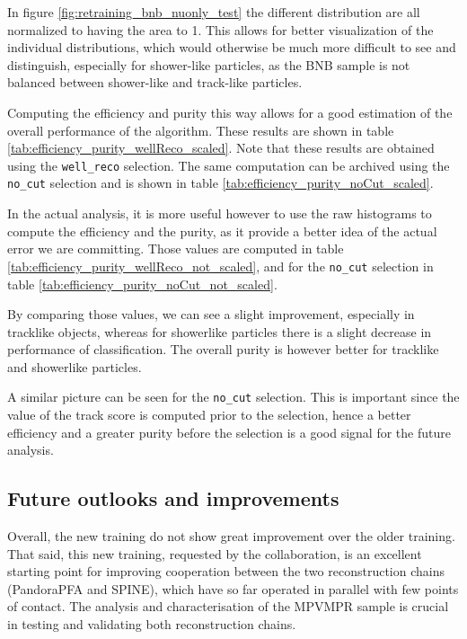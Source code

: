 In figure \ref{fig:retraining_bnb_nuonly_test} the different distribution are all normalized to having the area to 1. This allows for better visualization of the individual distributions, which would otherwise be much more difficult to see and distinguish, especially for shower-like particles, as the BNB sample is not balanced between shower-like and track-like particles. 



Computing the efficiency and purity this way allows for a good estimation of the overall performance of the algorithm. These results are shown in table \ref{tab:efficiency_purity_wellReco_scaled}. Note that these results are obtained using the \texttt{well\_reco} selection. The same computation can be archived using the \texttt{no\_cut} selection and is shown in table \ref{tab:efficiency_purity_noCut_scaled}. 

In the actual analysis, it is more useful however to use the raw histograms to compute the efficiency and the purity, as it provide a better idea of the actual error we are committing. Those values are computed in table \ref{tab:efficiency_purity_wellReco_not_scaled}, and for the \texttt{no\_cut} selection in table \ref{tab:efficiency_purity_noCut_not_scaled}. 

By comparing those values, we can see a slight improvement, especially in tracklike objects, whereas for showerlike particles there is a slight decrease in performance of classification. The overall purity is however better for tracklike and showerlike particles. 

A similar picture can be seen for the \texttt{no\_cut} selection. This is important since the value of the track score is computed prior to the selection, hence a better efficiency and a greater purity before the selection is a good signal for the future analysis. 

\subsection{Future outlooks and improvements}

Overall, the new training do not show great improvement over the older training. That said, this new training, requested by the collaboration, is an excellent starting point for improving cooperation between the two reconstruction chains (PandoraPFA and SPINE), which have so far operated in parallel with few points of contact. The analysis and characterisation of the MPVMPR sample is crucial in testing and validating both reconstruction chains. 

